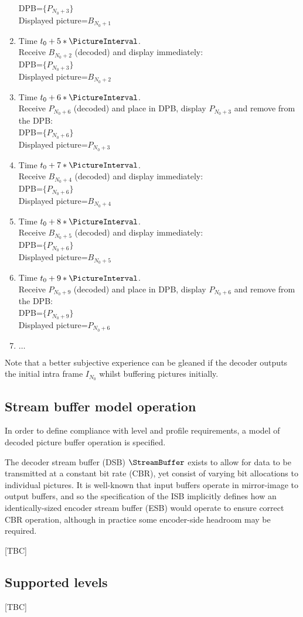 \begin{informative*}
\begin{enumerate}
DPB=$\{P_{N_0+3}\}$\\
Displayed picture=$B_{N_0+1}$
\item Time $t_0+5*\PictureInterval$. \\
Receive $B_{N_0+2}$ (decoded) and display immediately:\\
DPB=$\{P_{N_0+3}\}$\\
Displayed picture=$B_{N_0+2}$
\item Time $t_0+6*\PictureInterval$. \\
Receive $P_{N_0+6}$ (decoded) and place in DPB, display 
$P_{N_0+3}$ and remove from the DPB:\\
DPB=$\{P_{N_0+6}\}$\\
Displayed picture=$P_{N_0+3}$
\item Time $t_0+7*\PictureInterval$. \\
Receive $B_{N_0+4}$ (decoded) and display immediately:\\
DPB=$\{P_{N_0+6}\}$\\
Displayed picture=$B_{N_0+4}$
\item Time $t_0+8*\PictureInterval$. \\
Receive $B_{N_0+5}$ (decoded) and display immediately:\\
DPB=$\{P_{N_0+6}\}$\\
Displayed picture=$B_{N_0+5}$
\item Time $t_0+9*\PictureInterval$. \\
Receive $P_{N_0+9}$ (decoded) and place in DPB, display 
$P_{N_0+6}$ and remove from the DPB:\\
DPB=$\{P_{N_0+9}\}$\\
Displayed picture=$P_{N_0+6}$
\item $\ldots$
\end{enumerate}

Note that a better subjective experience can be gleaned if the
decoder outputs the initial intra frame $I_{N_0}$ whilst buffering
pictures initially.

\end{informative*}

\subsection{Stream buffer model operation}
\label{streambufferop}

In order to define compliance with level and profile requirements, a model of decoded picture buffer
operation is specified.

The decoder stream buffer (DSB) $\StreamBuffer$ exists to allow for data to be transmitted at a constant bit
rate (CBR), yet consist of varying bit allocations to individual pictures. It is well-known that input buffers
operate in mirror-image to output buffers, and so the specification of the ISB implicitly defines
how an identically-sized encoder stream buffer (ESB) would operate to ensure correct CBR operation, although
in practice some encoder-side headroom may be required.

[TBC]

\subsection{Supported levels}
[TBC]
